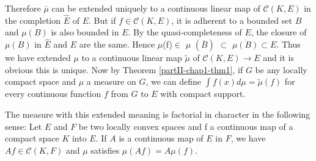 Therefore $\overline{\mu}$ can be extended uniquely to a continuous
linear map of $\mathscr{C} (K,E)$ in the completion $\hat{E}$ of
$E$. But if $f \in \mathscr{C}(K,E)$, it is adherent to a bounded set
$B$ and $\mu(B)$ is also bounded in $E$. By the quasi-completeness of
$E$,  
the closure of $\mu(B)$ in $\hat{E}$ and $E$ are the same. Hence
$\mu$(f)$\in$ $\mu$ $(\overline{B})$ $\subset$
$\overline{\mu(B)}\subset E$. Thus we have extended $\mu$ to a
continuous linear map $\tilde{\mu}$ of $\mathscr{C} (K,E)\rightarrow
E$ and it is obvious  
this is unique. Now by Theorem \ref{partII-chap1-thm1}, if $G$ be any
locally compact space and $\mu$ a measure on $G$, we can define  $\int
f(x) d\mu = \tilde{\mu}(f)$ for every continuous function $f$ from $G$
to $E$ with compact support.  

\begin{remark*}
The measure with this extended meaning is factorial in character in
the following sense: Let $E$ and $F$ be two locally convex spaces and
f a continuous map of a compact space $K$ into $E$. If $A$ is a
continuous map of $E$ in $F$, we have $Af \in \mathscr{C} (K, F)$
and $\mu$ satisfies $\mu (Af) =A \mu (f)$. 
\end{remark*}

